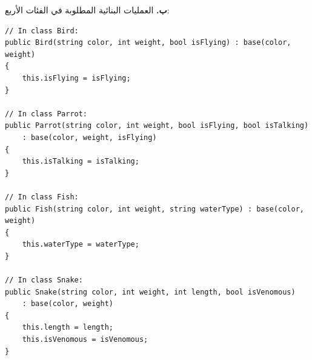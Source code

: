 \filbreak

\begin{boxSolution}
\textbf{ب.} العمليات البنائية المطلوبة في الفئات الأربع:
\begin{boxCode}
\begin{english}
\begin{verbatim}
// In class Bird:
public Bird(string color, int weight, bool isFlying) : base(color, weight)
{
    this.isFlying = isFlying;
}

// In class Parrot:
public Parrot(string color, int weight, bool isFlying, bool isTalking)
    : base(color, weight, isFlying)
{
    this.isTalking = isTalking;
}

// In class Fish:
public Fish(string color, int weight, string waterType) : base(color, weight)
{
    this.waterType = waterType;
}

// In class Snake:
public Snake(string color, int weight, int length, bool isVenomous)
    : base(color, weight)
{
    this.length = length;
    this.isVenomous = isVenomous;
}
\end{verbatim}
\end{english}
\end{boxCode}
\end{boxSolution}

\filbreak

